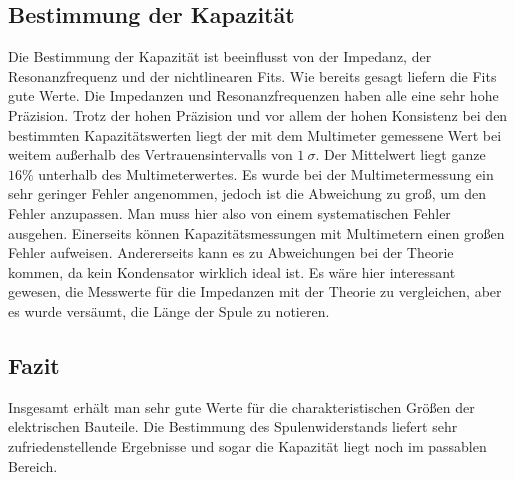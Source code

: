 \documentclass[12pt,a4paper,titlepage,headinclude]{scrartcl}
\numberwithin{equation}{subsection}
\begin{document}
\subsection{Bestimmung der Kapazität}
Die Bestimmung der Kapazität ist beeinflusst von der Impedanz, der Resonanzfrequenz und der nichtlinearen Fits. Wie bereits gesagt liefern die Fits gute Werte. Die Impedanzen und Resonanzfrequenzen haben alle eine sehr hohe Präzision. Trotz der hohen Präzision und vor allem der hohen Konsistenz bei den bestimmten Kapazitätswerten liegt der mit dem Multimeter gemessene Wert bei weitem außerhalb des Vertrauensintervalls von  $1~\sigma$. Der Mittelwert liegt ganze $16\%$ unterhalb des Multimeterwertes. Es wurde bei der Multimetermessung ein sehr geringer Fehler angenommen, jedoch ist die Abweichung zu groß, um den Fehler anzupassen. Man muss hier also von einem systematischen Fehler ausgehen. Einerseits können Kapazitätsmessungen mit Multimetern einen großen Fehler aufweisen. Andererseits kann es zu Abweichungen bei der Theorie kommen, da kein Kondensator wirklich ideal ist. Es wäre hier interessant gewesen, die Messwerte für die Impedanzen mit der Theorie zu vergleichen, aber es wurde versäumt, die Länge der Spule zu notieren.
\subsection{Fazit}
Insgesamt erhält man sehr gute Werte für die charakteristischen Größen der elektrischen Bauteile. Die Bestimmung des Spulenwiderstands liefert sehr zufriedenstellende Ergebnisse und sogar die Kapazität liegt noch im passablen Bereich.

\newpage
\printbibliography[heading=bibintoc]
\end{document}
